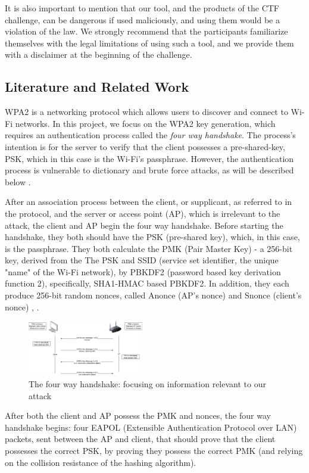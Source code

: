 \documentclass[sigconf]{acmart}
\begin{document}
It is also important to mention that our tool, and the products of the CTF challenge, can be dangerous if used maliciously, and using them would be a violation of the law. We strongly recommend that the participants familiarize themselves with the legal limitations of using such a tool, and we provide them with a disclaimer at the beginning of the challenge.

\subsection{Literature and Related Work}
WPA2 is a networking protocol which allows users to discover and connect to Wi-Fi networks. In this project, we focus on the WPA2 key generation, which requires an authentication process called the \textit{four way handshake}. The process's intention is for the server to verify that the client possesses a pre-shared-key, PSK, which in this case is the Wi-Fi's passphrase. However, the authentication process is vulnerable to dictionary and brute force attacks, as will be described below \cite{alhamry2022exploring}.

After an association process between the client, or supplicant, as referred to in the protocol, and the server or access point (AP), which is irrelevant to the attack, the client and AP begin the four way handshake.
Before starting the handshake, they both should have the PSK (pre-shared key), which, in this case, is the passphrase.
They both calculate the PMK (Pair Master Key) -  a 256-bit key, derived from the The PSK and SSID (service set identifier, the unique "name" of the Wi-Fi network), by PBKDF2 (password based key derivation function 2), specifically, SHA1-HMAC based PBKDF2. In addition, they each produce 256-bit random nonces, called Anonce (AP's nonce) and Snonce (client's nonce) \cite{alhamry2022exploring}, \cite{abo2017study}. 

\begin{figure}
    \includegraphics[width=0.45\textwidth]{four_way_handshake.png}
    \caption{The four way handshake: focusing on information relevant to our attack}
\end{figure}

After both the client and AP possess the PMK and nonces, the four way handshake begins: four EAPOL (Extensible Authentication Protocol over LAN) packets, sent between the AP and client, that should prove that the client possesses the correct PSK, by proving they possess the correct PMK (and relying on the collision resistance of the hashing algorithm).
\end{document}
